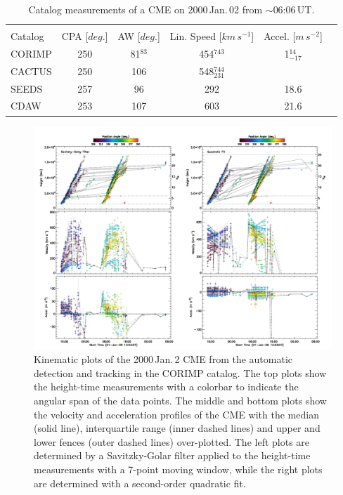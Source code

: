 \documentclass[referee,a4paper,12pt,traditabstract]{swsc}
\begin{document}
\begin{linenumbers}
\begin{table}[h]
\begin{tabular}{l*{4}{c}r}
\multicolumn{5}{c}{} \\
Catalog              & CPA [$deg.$] & AW [$deg.$] & Lin. Speed [$km\,s^{-1}$] & Accel. [$m\,s^{-2}$]  \\
\hline
CORIMP         & 250   & 81$^{83}$   & 454$^{743}$ &  1$_{-17}^{14}$  \\
CACTUS          & 250 & 106 & 548$_{231}^{744}$ &     \\
SEEDS        & 257 & 96 & 292 & 18.6  \\
CDAW     & 253 & 107 & 603 & 21.6 \\
\end{tabular}
\caption{Catalog measurements of a CME on 2000\,Jan.\,02 from $\sim$06:06\,UT.}
\label{table_20000102}
\end{table}

\begin{figure}[t]
\centerline{\includegraphics[width=\linewidth]{images/20000102_corimp_kins.pdf}}
\caption{Kinematic plots of the 2000\,Jan.\,2 CME from the automatic detection and tracking in the CORIMP catalog. The top plots show the height-time measurements with a colorbar to indicate the angular span of the data points. The middle and bottom plots show the velocity and acceleration profiles of the CME with the median (solid line), interquartile range (inner dashed lines) and upper and lower fences (outer dashed lines) over-plotted. The left plots are determined by a Savitzky-Golar filter applied to the height-time measurements with a 7-point moving window, while the right plots are determined with a second-order quadratic fit.}
\label{20000102_corimp_kins}
\end{figure}


\end{linenumbers}
\end{document}
